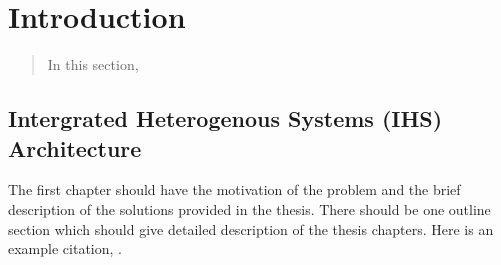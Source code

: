 \chapter{Introduction}
\label{chap:introduction}

\begin{quote} \small
In this section, 
\end{quote}

\section{Intergrated Heterogenous Systems (IHS) Architecture}

The first chapter should have the motivation of the problem and the brief description of the solutions provided in the thesis. There should be one outline section which should give detailed description of the thesis chapters. Here is an example citation, \cite{Nath2013}.